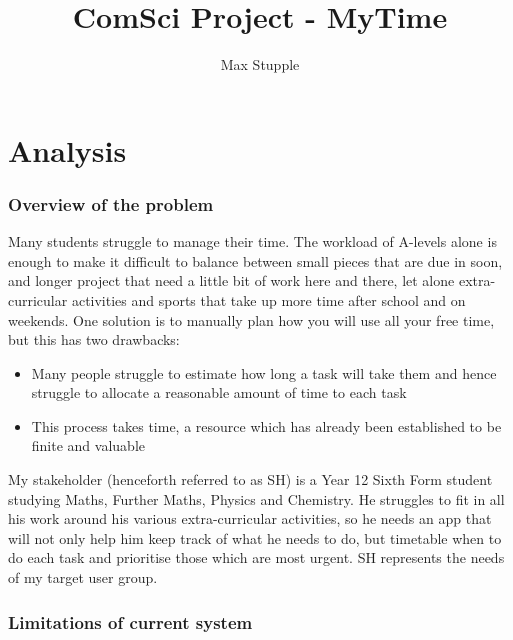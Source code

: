 \documentclass[]{article}
\title{ComSci Project - MyTime}
\author{Max Stupple}
\date{}
\begin{document}
\maketitle

\hypertarget{analysis}{%
\section{Analysis}\label{analysis}}

\hypertarget{overview-of-the-problem}{%
\subsubsection{Overview of the problem}\label{overview-of-the-problem}}

Many students struggle to manage their time. The workload of A-levels
alone is enough to make it difficult to balance between small pieces
that are due in soon, and longer project that need a little bit of work
here and there, let alone extra-curricular activities and sports that
take up more time after school and on weekends. One solution is to
manually plan how you will use all your free time, but this has two
drawbacks:

\begin{itemize}
\item
  Many people struggle to estimate how long a task will take them and
  hence struggle to allocate a reasonable amount of time to each task
\item
  This process takes time, a resource which has already been established
  to be finite and valuable
\end{itemize}

My stakeholder (henceforth referred to as SH) is a Year 12 Sixth Form
student studying Maths, Further Maths, Physics and Chemistry. He
struggles to fit in all his work around his various extra-curricular
activities, so he needs an app that will not only help him keep track of
what he needs to do, but timetable when to do each task and prioritise
those which are most urgent. SH represents the needs of my target user
group.

\hypertarget{limitations-of-current-system}{%
\subsubsection{Limitations of current
system}\label{limitations-of-current-system}}
\end{document}
